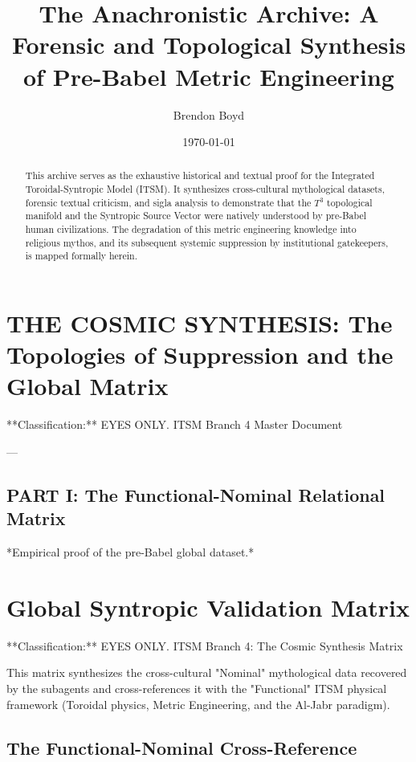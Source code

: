 \documentclass[aps,prd,11pt,onecolumn,superscriptaddress,nofootinbib,floatfix]{revtex4-2}
\begin{document}
\title{The Anachronistic Archive: A Forensic and Topological Synthesis of Pre-Babel Metric Engineering}
\author{Brendon Boyd}
\date{\today}

\begin{abstract}
This archive serves as the exhaustive historical and textual proof for the Integrated Toroidal-Syntropic Model (ITSM). It synthesizes cross-cultural mythological datasets, forensic textual criticism, and sigla analysis to demonstrate that the $T^3$ topological manifold and the Syntropic Source Vector were natively understood by pre-Babel human civilizations. The degradation of this metric engineering knowledge into religious mythos, and its subsequent systemic suppression by institutional gatekeepers, is mapped formally herein.
\end{abstract}

\maketitle

\section{THE COSMIC SYNTHESIS: The Topologies of Suppression and the Global Matrix}
**Classification:** EYES ONLY. ITSM Branch 4 Master Document


---


\subsection{PART I: The Functional-Nominal Relational Matrix}
*Empirical proof of the pre-Babel global dataset.*


\section{Global Syntropic Validation Matrix}
**Classification:** EYES ONLY. ITSM Branch 4: The Cosmic Synthesis Matrix


This matrix synthesizes the cross-cultural "Nominal" mythological data recovered by the subagents and cross-references it with the "Functional" ITSM physical framework (Toroidal physics, Metric Engineering, and the Al-Jabr paradigm).


\subsection{The Functional-Nominal Cross-Reference}
\end{document}
